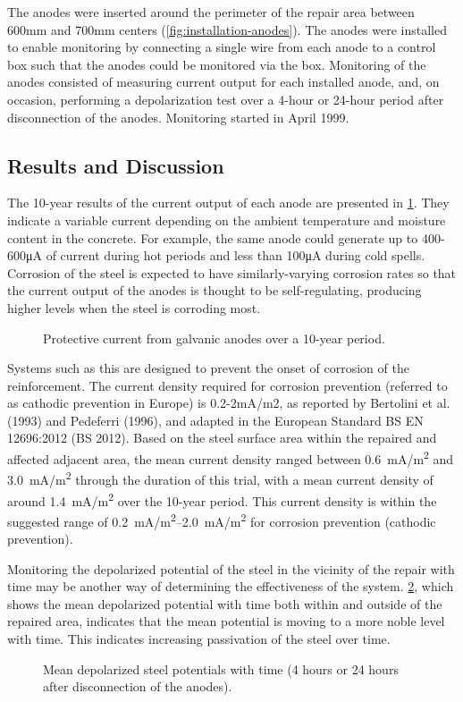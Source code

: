 The anodes were inserted around the perimeter of the repair area between 600mm and 700mm centers (\cref{fig:installation-anodes}). The anodes were installed to enable monitoring by connecting a single wire from each anode to a control box
such that the anodes could be monitored via the box. Monitoring of the anodes consisted of measuring current output for each installed anode, and, on occasion, performing a depolarization test over a 4-hour or 24-hour period after
disconnection of the anodes. Monitoring started in April 1999.


\subsection{Results and Discussion}
The 10-year results of the current output of each anode are presented in \cref{fig:protective-current}. They indicate a variable current depending on the ambient temperature and moisture content in the concrete. For example, the same anode could generate up to 400-600μA of current during hot periods and less than 100μA during cold spells. Corrosion of the steel is expected to have similarly-varying corrosion rates so that the current output of the anodes is thought to be self-regulating, producing higher levels when the steel is corroding most.

\begin{figure}
  \caption{Protective current from galvanic anodes over a 10-year period.}\label{fig:protective-current}
\end{figure}

Systems such as this are designed to prevent the onset of corrosion of the reinforcement. The current density required for corrosion prevention (referred to as cathodic prevention in Europe) is 0.2-2mA/m2, as reported by Bertolini et al. (1993) and Pedeferri (1996), and adapted in the European Standard BS EN 12696:2012 (BS 2012). Based on the steel surface area within the repaired and affected adjacent area, the mean current density ranged between \qty{0.6}{mA/m^2} and \qty{3.0}{mA/m^2} through the duration of this trial, with a mean current density of around \qty{1.4}{mA/m^2} over the 10-year period. This current density is within the suggested range of \qtyrange{0.2}{2.0}{mA/m^2} for corrosion prevention (cathodic prevention).

Monitoring the depolarized potential of the steel in the vicinity of the repair with time may be another way of determining the effectiveness of the system. \cref{fig:depolarize-potentials-with-time}, which shows the mean depolarized potential with time both within and outside of the repaired area, indicates that the mean potential is moving to a more noble level with time. This indicates increasing passivation of the steel over time.

\begin{figure}
  \caption{Mean depolarized steel potentials with time (4 hours or 24 hours after disconnection of the anodes).}\label{fig:depolarize-potentials-with-time}
\end{figure}